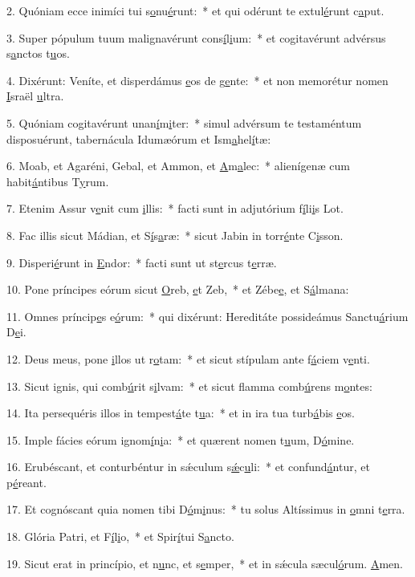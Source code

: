 2. Quóniam ecce inimíci tui s\uline{o}nu\uline{é}runt:~* et qui odérunt te extul\uline{é}runt c\uline{a}put.\par 
3. Super pópulum tuum malignavérunt cons\uline{í}l\uline{i}um:~* et cogitavérunt advérsus s\uline{a}nctos t\uline{u}os.\par 
4. Dixérunt: Veníte, et disperdámus \uline{e}os de g\uline{e}nte:~* et non memorétur nomen \uline{I}sraël \uline{u}ltra.\par 
5. Quóniam cogitavérunt unan\uline{í}m\uline{i}ter:~* simul advérsum te testaméntum disposuérunt, tabernácula Idumæórum et Ism\uline{a}hel\uline{í}tæ:\par 
6. Moab, et Agaréni, Gebal, et Ammon, et \uline{A}m\uline{a}lec:~* alienígenæ cum habit\uline{á}ntibus T\uline{y}rum.\par 
7. Etenim Assur v\uline{e}nit cum \uline{i}llis:~* facti sunt in adjutórium f\uline{í}li\uline{i}s Lot.\par 
8. Fac illis sicut Mádian, et S\uline{í}s\uline{a}ræ:~* sicut Jabin in torr\uline{é}nte C\uline{i}sson.\par 
9. Disperi\uline{é}runt in \uline{E}ndor:~* facti sunt ut st\uline{e}rcus t\uline{e}rræ.\par 
10. Pone príncipes eórum sicut \uline{O}reb, \uline{e}t Zeb,~* et Zébe\uline{e}, et S\uline{á}lmana:\par 
11. Omnes príncip\uline{e}s e\uline{ó}rum:~* qui dixérunt: Hereditáte possideámus Sanctu\uline{á}rium D\uline{e}i.\par 
12. Deus meus, pone \uline{i}llos ut r\uline{o}tam:~* et sicut stípulam ante f\uline{á}ciem v\uline{e}nti.\par 
13. Sicut ignis, qui comb\uline{ú}rit s\uline{i}lvam:~* et sicut flamma comb\uline{ú}rens m\uline{o}ntes:\par 
14. Ita persequéris illos in tempest\uline{á}te t\uline{u}a:~* et in ira tua turb\uline{á}bis \uline{e}os.\par 
15. Imple fácies eórum ignom\uline{í}n\uline{i}a:~* et quærent nomen t\uline{u}um, D\uline{ó}mine.\par 
16. Erubéscant, et conturbéntur in sǽculum s\uline{ǽ}c\uline{u}li:~* et confund\uline{á}ntur, et p\uline{é}reant.\par 
17. Et cognóscant quia nomen tibi D\uline{ó}m\uline{i}nus:~* tu solus Altíssimus in \uline{o}mni t\uline{e}rra.\par 
18. Glória Patri, et F\uline{í}l\uline{i}o,~* et Spir\uline{í}tui S\uline{a}ncto.\par 
19. Sicut erat in princípio, et n\uline{u}nc, et s\uline{e}mper,~* et in sǽcula sæcul\uline{ó}rum. \uline{A}men.\par 
